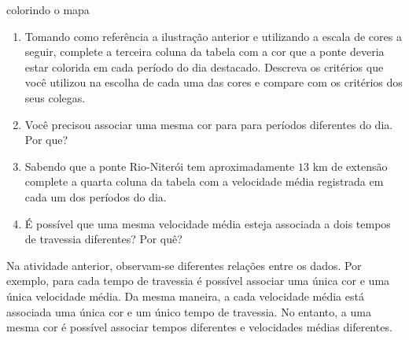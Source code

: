 \begin{task}{ colorindo o mapa}
\begin{enumerate}
\item {} 
Tomando como referência a ilustração anterior e utilizando a escala de cores a seguir, complete a terceira coluna da tabela com a cor que a ponte deveria estar colorida em cada período do dia destacado. Descreva os critérios que você utilizou na escolha de cada uma das cores e compare com os critérios dos seus colegas.
\begin{center}\end{center}
\item {} 
Você precisou associar uma mesma cor para para períodos diferentes do dia. Por que?

\item {} 
Sabendo que a ponte Rio-Niterói tem aproximadamente \(13\) km de extensão complete a quarta coluna da tabela com a velocidade média registrada em cada um dos períodos do dia.

\item {} 
É possível que uma mesma velocidade média esteja associada a dois tempos de travessia diferentes? Por quê?
\end{enumerate}
\end{task}

Na atividade anterior, observam-se diferentes relações entre os dados. Por exemplo, para cada tempo de travessia é possível associar uma única cor e uma única velocidade média. Da mesma maneira, a cada velocidade média está associada uma única cor e um único tempo de travessia. No entanto, a uma mesma cor é possível associar tempos diferentes e velocidades médias diferentes.

